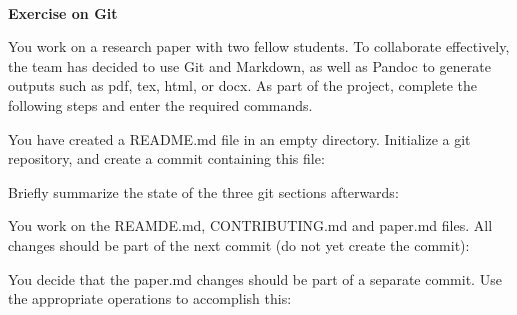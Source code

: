 \documentclass[12pt]{scrartcl}
\begin{document}
~
\medskip
    \begin{center}
      \textbf{\large{Exercise on Git}}\\
    \end{center}

\vspace{0.5cm}
\noindent
You work on a research paper with two fellow students. To collaborate effectively, the team has decided to use Git and Markdown, as well as Pandoc to generate outputs such as pdf, tex, html, or docx. As part of the project, complete the following steps and enter the required commands.

\vspace{0.5cm}

\noindent
You have created a README.md file in an empty directory. Initialize a git repository, and create a commit containing this file:

\vspace{0.5cm}

\hrulefill

\vspace{0.5cm}

\hrulefill

\vspace{0.5cm}

\hrulefill

\vspace{0.5cm}
\noindent
Briefly summarize the state of the three git sections afterwards:
\vspace{0.5cm}

\hrulefill

\vspace{0.5cm}

\hrulefill

\vspace{0.5cm}

\hrulefill

\vspace{0.5cm}
\noindent
You work on the REAMDE.md, CONTRIBUTING.md and paper.md files. All changes should be part of the next commit (do not yet create the commit):

\vspace{0.5cm}

\hrulefill

\vspace{0.5cm}
\noindent
You decide that the paper.md changes should be part of a separate commit. Use the appropriate operations to accomplish this:
\vspace{0.5cm}
\end{document}
